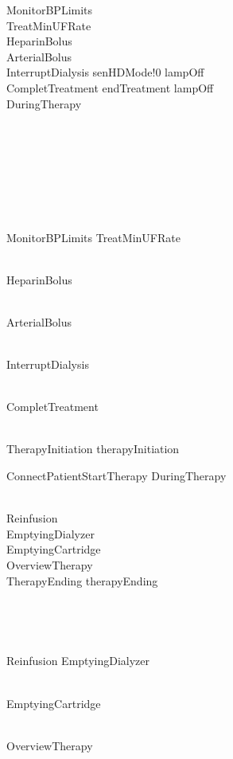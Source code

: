 \begin{circus}
	MonitorBPLimits \circdef \Skip\\
	TreatMinUFRate \circdef \Skip\\
	HeparinBolus \circdef \Skip\\
	ArterialBolus \circdef \Skip\\
	InterruptDialysis \circdef senHDMode!0 \then lampOff \then \Skip\\
	CompletTreatment \circdef endTreatment \then lampOff \then \Skip\\
	DuringTherapy \circdef \\
	\begin{block}
		\\
		\begin{block}
			\\
				\begin{block}
					\\
						\begin{block}
							\\
								\begin{block}
									MonitorBPLimits \interleave TreatMinUFRate
								\end{block}\\
								 \interleave HeparinBolus
						\end{block}\\
						 \interleave ArterialBolus
				\end{block}\\
				 \interleave InterruptDialysis
		\end{block}\\
		 \circseq CompletTreatment
	\end{block}\\
	
	TherapyInitiation \circdef therapyInitiation \then \\
	\begin{block}
		ConnectPatientStartTherapy \circseq DuringTherapy
	\end{block}\\
	
	Reinfusion \circdef \Skip\\
	EmptyingDialyzer \circdef \Skip\\
	EmptyingCartridge \circdef \Skip\\
	OverviewTherapy \circdef \Skip\\
	TherapyEnding \circdef therapyEnding \then \\
	\begin{block}
		\\
		\begin{block}
			\\
			\begin{block}
				Reinfusion \circseq EmptyingDialyzer
			\end{block}\\
			 \circseq EmptyingCartridge
		\end{block}\\
		 \circseq OverviewTherapy
	\end{block}\\
	

\end{circus}
